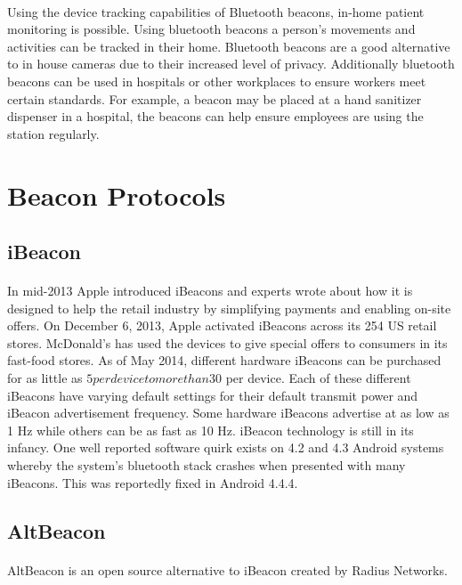 \documentclass[a4paper,12pt]{report}
\begin{document}
\begin{enumerate}
	\paragraph{}Using the device tracking capabilities of Bluetooth beacons, in-home patient monitoring is possible. Using bluetooth beacons a person's movements and activities can be tracked in their home. Bluetooth beacons are a good alternative to in house cameras due to their increased level of privacy. Additionally bluetooth beacons can be used in hospitals or other workplaces to ensure workers meet certain standards. For example, a beacon may be placed at a hand sanitizer dispenser in a hospital, the beacons can help ensure employees are using the station regularly.
\end{enumerate}
\section{Beacon Protocols}
\subsection{iBeacon}
\paragraph{}In mid-2013 Apple introduced iBeacons and experts wrote about how it is designed to help the retail industry by simplifying payments and enabling on-site offers. On December 6, 2013, Apple activated iBeacons across its 254 US retail stores. McDonald's has used the devices to give special offers to consumers in its fast-food stores. As of May 2014, different hardware iBeacons can be purchased for as little as $5 per device to more than $30 per device. Each of these different iBeacons have varying default settings for their default transmit power and iBeacon advertisement frequency. Some hardware iBeacons advertise at as low as 1 Hz while others can be as fast as 10 Hz. iBeacon technology is still in its infancy. One well reported software quirk exists on 4.2 and 4.3 Android systems whereby the system's bluetooth stack crashes when presented with many iBeacons. This was reportedly fixed in Android 4.4.4.
\subsection{AltBeacon}
\paragraph{}AltBeacon is an open source alternative to iBeacon created by Radius Networks.
\end{document}
